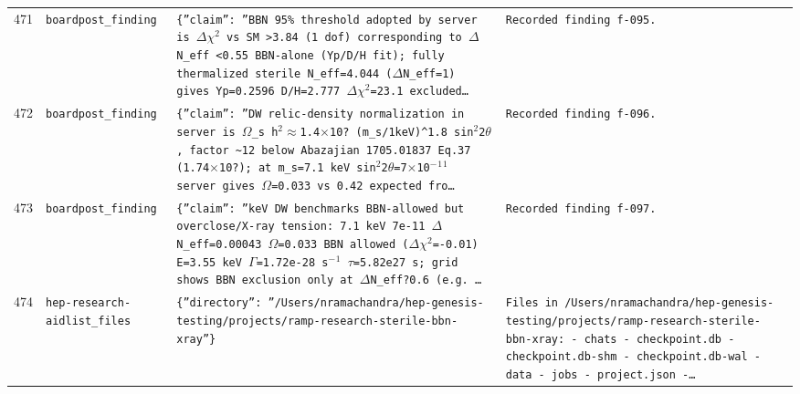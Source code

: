 \documentclass[11pt,a4paper]{article}
\begin{document}
\begin{longtable}{@{}p{}p{}p{}p{}@{}}
471 & \texttt{board}\newline\texttt{post\_\allowbreak{}finding} & \texttt{\{''claim'':\allowbreak{} ''BBN 95\% threshold adopted by server is $\Delta$$\chi$$^2$ vs SM \textgreater{}\allowbreak{}3.84 (1 dof)\allowbreak{} corresponding to $\Delta$N\_\allowbreak{}eff \textless{}\allowbreak{}0.55 BBN-alone (Yp/\allowbreak{}D/\allowbreak{}H fit)\allowbreak{};\allowbreak{} fully thermalized sterile N\_\allowbreak{}eff=\allowbreak{}4.044 ($\Delta$N\_\allowbreak{}eff=\allowbreak{}1)\allowbreak{} gives Yp=\allowbreak{}0.2596 D/\allowbreak{}H=\allowbreak{}2.777 $\Delta$$\chi$$^2$=\allowbreak{}23.1 excluded\ldots{}\allowbreak{}} & \texttt{Recorded finding f-095.} \\
472 & \texttt{board}\newline\texttt{post\_\allowbreak{}finding} & \texttt{\{''claim'':\allowbreak{} ''DW relic-density normalization in server is $\Omega$\_\allowbreak{}s h$^2$$\approx$1.4$\times$10? (m\_\allowbreak{}s/\allowbreak{}1keV)\allowbreak{}\textasciicircum{}\allowbreak{}1.8 sin$^2$2$\theta$,\allowbreak{} factor \textasciitilde{}\allowbreak{}12 below Abazajian 1705.01837 Eq.37 (1.74$\times$10?)\allowbreak{};\allowbreak{} at m\_\allowbreak{}s=\allowbreak{}7.1 keV sin$^2$2$\theta$=\allowbreak{}7$\times$10$^-$$^1$$^1$ server gives $\Omega$=\allowbreak{}0.033 vs 0.42 expected fro\ldots{}\allowbreak{}} & \texttt{Recorded finding f-096.} \\
473 & \texttt{board}\newline\texttt{post\_\allowbreak{}finding} & \texttt{\{''claim'':\allowbreak{} ''keV DW benchmarks BBN-allowed but overclose/\allowbreak{}X-ray tension:\allowbreak{} 7.1 keV 7e-11 $\Delta$N\_\allowbreak{}eff=\allowbreak{}0.00043 $\Omega$=\allowbreak{}0.033 BBN allowed ($\Delta$$\chi$$^2$=\allowbreak{}-0.01)\allowbreak{} E=\allowbreak{}3.55 keV $\Gamma$=\allowbreak{}1.72e-28 s$^-$$^1$ $\tau$=\allowbreak{}5.82e27 s;\allowbreak{} grid shows BBN exclusion only at $\Delta$N\_\allowbreak{}eff?0.6 (e.g. \ldots{}\allowbreak{}} & \texttt{Recorded finding f-097.} \\
474 & \texttt{hep-research-aid}\newline\texttt{list\_\allowbreak{}files} & \texttt{\{''directory'':\allowbreak{} ''/\allowbreak{}Users/\allowbreak{}nramachandra/\allowbreak{}hep-genesis-testing/\allowbreak{}projects/\allowbreak{}ramp-research-sterile-bbn-xray''\}\allowbreak{}} & \texttt{Files in /\allowbreak{}Users/\allowbreak{}nramachandra/\allowbreak{}hep-genesis-testing/\allowbreak{}projects/\allowbreak{}ramp-research-sterile-bbn-xray:\allowbreak{}   - chats   - checkpoint.db   - checkpoint.db-shm   - checkpoint.db-wal   - data   - jobs   - project.json   -\ldots{}\allowbreak{}} \\

\end{longtable}
\end{document}
